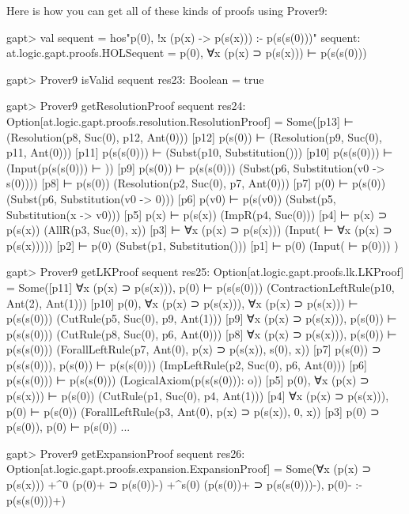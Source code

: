 \documentclass[a4paper,11pt]{book}
\begin{document}
Here is how you can get all of these kinds of proofs using Prover9:
\begin{clilisting}
gapt> val sequent = hos"p(0), !x (p(x) -> p(s(x))) :- p(s(s(0)))"
sequent: at.logic.gapt.proofs.HOLSequent = p(0), ∀x (p(x) ⊃ p(s(x))) ⊢ p(s(s(0)))

\end{clilisting}

\begin{clilisting}
gapt> Prover9 isValid sequent
res23: Boolean = true

gapt> Prover9 getResolutionProof sequent
res24: Option[at.logic.gapt.proofs.resolution.ResolutionProof] =
Some([p13]  ⊢    (Resolution(p8, Suc(0), p12, Ant(0)))
[p12] p(s(0)) ⊢    (Resolution(p9, Suc(0), p11, Ant(0)))
[p11] p(s(s(0))) ⊢    (Subst(p10, Substitution()))
[p10] p(s(s(0))) ⊢    (Input(p(s(s(0))) ⊢ ))
[p9] p(s(0)) ⊢ p(s(s(0)))   (Subst(p6, Substitution(v0 -> s(0))))
[p8]  ⊢ p(s(0))   (Resolution(p2, Suc(0), p7, Ant(0)))
[p7] p(0) ⊢ p(s(0))   (Subst(p6, Substitution(v0 -> 0)))
[p6] p(v0) ⊢ p(s(v0))   (Subst(p5, Substitution(x -> v0)))
[p5] p(x) ⊢ p(s(x))   (ImpR(p4, Suc(0)))
[p4]  ⊢ p(x) ⊃ p(s(x))   (AllR(p3, Suc(0), x))
[p3]  ⊢ ∀x (p(x) ⊃ p(s(x)))   (Input( ⊢ ∀x (p(x) ⊃ p(s(x)))))
[p2]  ⊢ p(0)   (Subst(p1, Substitution()))
[p1]  ⊢ p(0)   (Input( ⊢ p(0)))
)

gapt> Prover9 getLKProof sequent
res25: Option[at.logic.gapt.proofs.lk.LKProof] =
Some([p11] ∀x (p(x) ⊃ p(s(x))), p(0) ⊢ p(s(s(0)))    (ContractionLeftRule(p10, Ant(2), Ant(1)))
[p10] p(0), ∀x (p(x) ⊃ p(s(x))), ∀x (p(x) ⊃ p(s(x))) ⊢ p(s(s(0)))    (CutRule(p5, Suc(0), p9, Ant(1)))
[p9] ∀x (p(x) ⊃ p(s(x))), p(s(0)) ⊢ p(s(s(0)))    (CutRule(p8, Suc(0), p6, Ant(0)))
[p8] ∀x (p(x) ⊃ p(s(x))), p(s(0)) ⊢ p(s(s(0)))    (ForallLeftRule(p7, Ant(0), p(x) ⊃ p(s(x)), s(0), x))
[p7] p(s(0)) ⊃ p(s(s(0))), p(s(0)) ⊢ p(s(s(0)))    (ImpLeftRule(p2, Suc(0), p6, Ant(0)))
[p6] p(s(s(0))) ⊢ p(s(s(0)))    (LogicalAxiom(p(s(s(0))): o))
[p5] p(0), ∀x (p(x) ⊃ p(s(x))) ⊢ p(s(0))    (CutRule(p1, Suc(0), p4, Ant(1)))
[p4] ∀x (p(x) ⊃ p(s(x))), p(0) ⊢ p(s(0))    (ForallLeftRule(p3, Ant(0), p(x) ⊃ p(s(x)), 0, x))
[p3] p(0) ⊃ p(s(0)), p(0) ⊢ p(s(0))  ...

gapt> Prover9 getExpansionProof sequent
res26: Option[at.logic.gapt.proofs.expansion.ExpansionProof] =
Some(∀x (p(x) ⊃ p(s(x))) +^{0} (p(0)+ ⊃ p(s(0))-) +^{s(0)} (p(s(0))+ ⊃ p(s(s(0)))-),
p(0)-
:-
p(s(s(0)))+)

\end{clilisting}
\end{document}
